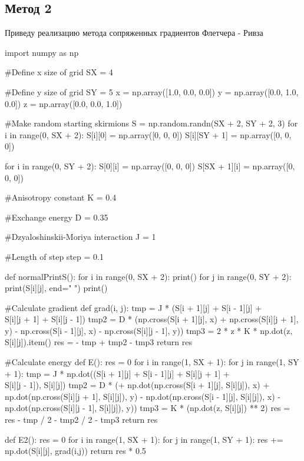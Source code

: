 \documentclass[ 12pt,x11names]{article}
\begin{document}
\subsection{Метод 2}
 Приведу реализацию метода сопряженных градиентов Флетчера - Ривза
 \begin{python}
 import numpy as np

#Define  x size of grid
SX = 4

#Define y size of grid
SY = 5
x = np.array([1.0, 0.0, 0.0])
y = np.array([0.0, 1.0, 0.0])
z = np.array([0.0, 0.0, 1.0])

#Make random starting skirmions
S = np.random.randn(SX + 2, SY + 2, 3)
for i in range(0, SX + 2):
    S[i][0] = np.array([0, 0, 0])
    S[i][SY + 1] = np.array([0, 0, 0])

for i in range(0, SY + 2):
    S[0][i] = np.array([0, 0, 0])
    S[SX + 1][i] = np.array([0, 0, 0])

 #Anisotropy constant
K = 0.4

#Exchange energy
D = 0.35

#Dzyaloshinskii-Moriya interaction
J = 1

#Length of step
step = 0.1

def normalPrintS():
    for i in range(0, SX + 2):
        print()
        for j in range(0, SY + 2):
            print(S[i][j], end=" ")
    print()

#Calculate gradient
def grad(i, j):
    tmp = J * (S[i + 1][j] + S[i - 1][j] +\\
        S[i][j + 1] + S[i][j - 1])
    tmp2 = D * (np.cross(S[i + 1][j], x) +
    np.cross(S[i][j + 1], y) -
    np.cross(S[i - 1][j], x) - np.cross(S[i][j - 1], y))
    tmp3 = 2 * z * K * np.dot(z, S[i][j]).item()
    res = - tmp + tmp2 - tmp3
    return res

#Calculate energy
def E():
    res = 0
    for i in range(1, SX + 1):
        for j in range(1, SY + 1):
            tmp = J * np.dot((S[i + 1][j] + S[i - 1][j] + S[i][j + 1] +\\ S[i][j - 1]), S[i][j])
            tmp2 = D * (+ np.dot(np.cross(S[i + 1][j], S[i][j]), x)
                        + np.dot(np.cross(S[i][j + 1], S[i][j]), y)
                        - np.dot(np.cross(S[i - 1][j], S[i][j]), x)
                        - np.dot(np.cross(S[i][j - 1], S[i][j]), y))
            tmp3 = K * (np.dot(z, S[i][j]) ** 2)
            res = res - tmp / 2 - tmp2 / 2 - tmp3
    return res

def E2():
    res = 0
    for i in range(1, SX + 1):
        for j in range(1, SY + 1):
            res += np.dot(S[i][j], grad(i,j))
    return res * 0.5


\end{python}
\end{document}

